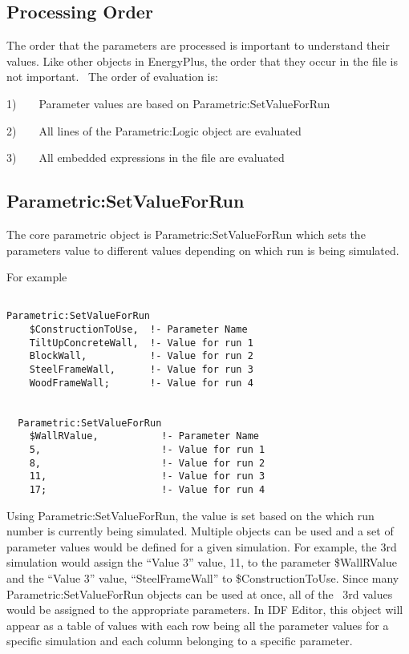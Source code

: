 \subsection{Processing Order}\label{processing-order}

The order that the parameters are processed is important to understand their values. Like other objects in EnergyPlus, the order that they occur in the file is not important.~ The order of evaluation is:

1)~~~~Parameter values are based on Parametric:SetValueForRun

2)~~~~All lines of the Parametric:Logic object are evaluated

3)~~~~All embedded expressions in the file are evaluated

\subsection{Parametric:SetValueForRun}\label{parametricsetvalueforrun}

The core parametric object is Parametric:SetValueForRun which sets the parameters value to different values depending on which run is being simulated.

For example

\begin{lstlisting}

Parametric:SetValueForRun
    $ConstructionToUse,  !- Parameter Name
    TiltUpConcreteWall,  !- Value for run 1
    BlockWall,           !- Value for run 2
    SteelFrameWall,      !- Value for run 3
    WoodFrameWall;       !- Value for run 4


  Parametric:SetValueForRun
    $WallRValue,           !- Parameter Name
    5,                     !- Value for run 1
    8,                     !- Value for run 2
    11,                    !- Value for run 3
    17;                    !- Value for run 4
\end{lstlisting}

Using Parametric:SetValueForRun, the value is set based on the which run number is currently being simulated. Multiple objects can be used and a set of parameter values would be defined for a given simulation. For example, the 3rd simulation would assign the ``Value 3'' value, 11, to the parameter \$WallRValue and the ``Value 3'' value, ``SteelFrameWall'' to \$ConstructionToUse. Since many Parametric:SetValueForRun objects can be used at once, all of the~ 3rd values would be assigned to the appropriate parameters. In IDF Editor, this object will appear as a table of values with each row being all the parameter values for a specific simulation and each column belonging to a specific parameter.

